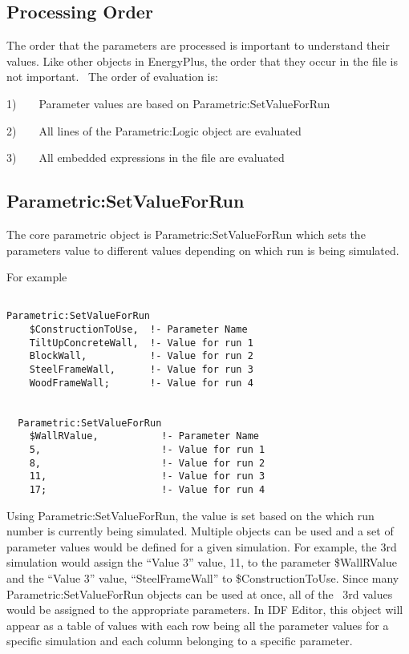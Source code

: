 \subsection{Processing Order}\label{processing-order}

The order that the parameters are processed is important to understand their values. Like other objects in EnergyPlus, the order that they occur in the file is not important.~ The order of evaluation is:

1)~~~~Parameter values are based on Parametric:SetValueForRun

2)~~~~All lines of the Parametric:Logic object are evaluated

3)~~~~All embedded expressions in the file are evaluated

\subsection{Parametric:SetValueForRun}\label{parametricsetvalueforrun}

The core parametric object is Parametric:SetValueForRun which sets the parameters value to different values depending on which run is being simulated.

For example

\begin{lstlisting}

Parametric:SetValueForRun
    $ConstructionToUse,  !- Parameter Name
    TiltUpConcreteWall,  !- Value for run 1
    BlockWall,           !- Value for run 2
    SteelFrameWall,      !- Value for run 3
    WoodFrameWall;       !- Value for run 4


  Parametric:SetValueForRun
    $WallRValue,           !- Parameter Name
    5,                     !- Value for run 1
    8,                     !- Value for run 2
    11,                    !- Value for run 3
    17;                    !- Value for run 4
\end{lstlisting}

Using Parametric:SetValueForRun, the value is set based on the which run number is currently being simulated. Multiple objects can be used and a set of parameter values would be defined for a given simulation. For example, the 3rd simulation would assign the ``Value 3'' value, 11, to the parameter \$WallRValue and the ``Value 3'' value, ``SteelFrameWall'' to \$ConstructionToUse. Since many Parametric:SetValueForRun objects can be used at once, all of the~ 3rd values would be assigned to the appropriate parameters. In IDF Editor, this object will appear as a table of values with each row being all the parameter values for a specific simulation and each column belonging to a specific parameter.

